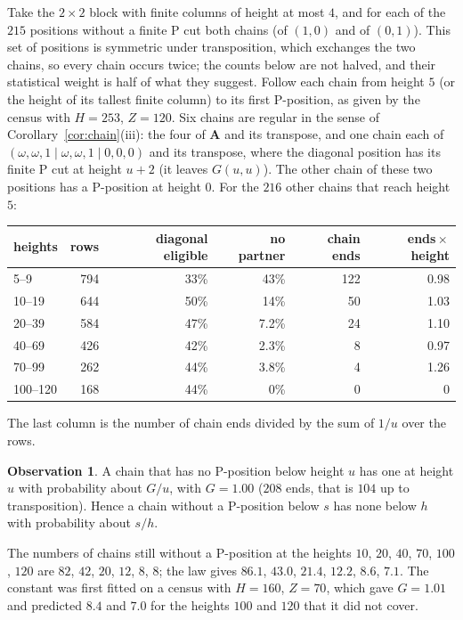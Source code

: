 \documentclass[11pt]{amsart}
\theoremstyle{definition}
\newtheorem{observation}[theorem]{Observation}
\theoremstyle{remark}
\newcommand{\w}{\omega}
\newcommand{\PA}{\mathbf{A}}
\begin{document}
Take the $2\times2$ block with finite columns of height at most $4$, and for each of the $215$
positions without a finite P cut both chains (of $(1,0)$ and of $(0,1)$). This set of
positions is symmetric under transposition, which exchanges the two chains, so every chain
occurs twice; the counts below are not halved, and their statistical weight is half of what
they suggest. Follow each chain
from height $5$ (or the height of its tallest finite column) to its first P-position, as given
by the census with $H=253$, $Z=120$. Six chains are regular in the sense of
Corollary~\ref{cor:chain}(iii): the four of $\PA$ and its transpose, and one chain each of
$(\w,\w,1\mid\w,\w,1\mid0,0,0)$ and its transpose, where the diagonal position has its finite P
cut at height $u+2$ (it leaves $G(u,u)$). The other chain of these two positions has a
P-position at height $0$. For the $216$ other chains that reach height $5$:
\begin{center}
\begin{tabular}{lrrrrr}
\toprule
heights & rows & diagonal eligible & no partner & chain ends & ends${}\times{}$height\\
\midrule
5--9 & 794 & 33\% & 43\% & 122 & 0.98\\
10--19 & 644 & 50\% & 14\% & 50 & 1.03\\
20--39 & 584 & 47\% & 7.2\% & 24 & 1.10\\
40--69 & 426 & 42\% & 2.3\% & 8 & 0.97\\
70--99 & 262 & 44\% & 3.8\% & 4 & 1.26\\
100--120 & 168 & 44\% & 0\% & 0 & 0\\
\bottomrule
\end{tabular}
\end{center}
The last column is the number of chain ends divided by the sum of $1/u$ over the rows.

\begin{observation}\label{obs:law}
A chain that has no P-position below height $u$ has one at height $u$ with probability about
$G/u$, with $G=1.00$ ($208$ ends, that is $104$ up to transposition). Hence a chain without a
P-position below $s$ has none below $h$ with probability about $s/h$.
\end{observation}

The numbers of chains still without a P-position at the heights $10$, $20$, $40$, $70$,
$100$, $120$ are $82$, $42$, $20$, $12$, $8$, $8$; the law gives $86.1$, $43.0$, $21.4$,
$12.2$, $8.6$, $7.1$. The constant was first fitted
on a census with $H=160$, $Z=70$, which gave $G=1.01$ and predicted $8.4$ and $7.0$ for the
heights $100$ and $120$ that it did not cover.
\end{document}

